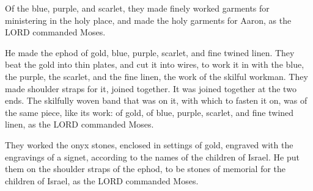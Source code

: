  Of the blue, purple, and scarlet, they made finely worked
garments for ministering in the holy place, and made the holy garments
for Aaron, as the LORD commanded Moses.

 He made the ephod of gold, blue, purple, scarlet, and
fine twined linen.  They beat the gold into thin plates,
and cut it into wires, to work it in with the blue, the purple, the
scarlet, and the fine linen, the work of the skilful workman.
 They made shoulder straps for it, joined together. It was
joined together at the two ends.  The skilfully woven band
that was on it, with which to fasten it on, was of the same piece, like
its work: of gold, of blue, purple, scarlet, and fine twined linen, as
the LORD commanded Moses.

 They worked the onyx stones, enclosed in settings of
gold, engraved with the engravings of a signet, according to the names
of the children of Israel.  He put them on the shoulder
straps of the ephod, to be stones of memorial for the children of
Israel, as the LORD commanded Moses.

